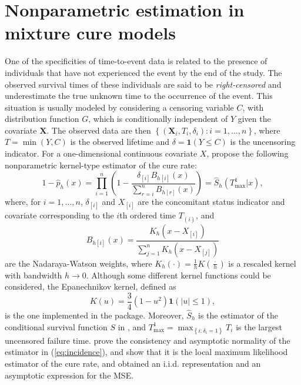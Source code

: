 \section{Nonparametric estimation in mixture cure models} 
\label{sec:np_estimation}

One of the specificities of time-to-event data is related to the presence of individuals that have not experienced the event by the end of the study. The observed survival times of these individuals are said to be \emph{right-censored} and underestimate the true unknown time to the occurrence of the event. This situation is usually modeled by considering a censoring variable $C$, with distribution function $G$, which is conditionally independent of $Y$ given the covariate $\mathbf{X}$. The observed data are then $\left \{\left (\mathbf{X}_i,T_i,\delta_i \right) : i=1,\ldots,n\right \}$, where $T=\min \left(Y,C \right)$ is the observed lifetime and $\delta=\mathbf{1}\left(Y\le C \right)$ is the uncensoring indicator. For a one-dimensional continuous covariate $X$, \cite{Xu} propose the following nonparametric kernel-type estimator of the cure rate:
\begin{equation}
  1-\hat p_h \left(x \right)= \prod_{i=1}^{n} \left(1-\frac{\delta_{[i]} B_{h[i]}(x)}{\sum_{r=i}^n B_{h[r]}(x)} \right) = \hat S_h(T_{\max}^1|x),
  \label{eq:incidence}
\end{equation}
where, for $i=1,\ldots,n$, $\delta_{[i]}$ and $X_{[i]}$ are the concomitant status indicator and covariate corresponding to the $i$th ordered time $T_{(i)}$, and
\begin{equation}  \label{NW_weights}
  B_{h[i]}(x) = \frac{K_h \left (x-X_{[i]} \right)}{\sum_{j=1}^n K_h \left (x-X_{[j]} \right)}
\end{equation}
are the Nadaraya-Watson weights, where $K_h(\cdot)=\frac{1}{h} K\left (\frac{\cdot}{h}\right)$ is a rescaled kernel with bandwidth $h \rightarrow 0$. Although some different kernel functions could be considered, the Epanechnikov kernel, defined as
\begin{equation*}
K(u) = \frac{3}{4} (1-u^2) \mathbf{1}(|u| \leq 1),
\end{equation*}
is the one implemented in the  package. Moreover, $\hat{S}_h$ is the estimator of the conditional survival function $S$ in \cite{Beran}, and $T_{\max}^1=\max_{\left \{i:\delta_i=1\right \}}T_i$ is the largest uncensored failure time. \cite{Xu} prove the consistency and asymptotic normality of the estimator in (\ref{eq:incidence}), and \cite{Lopez1} show that it is the local maximum likelihood estimator of the cure rate, and obtained an i.i.d. representation and an asymptotic expression for the MSE.

